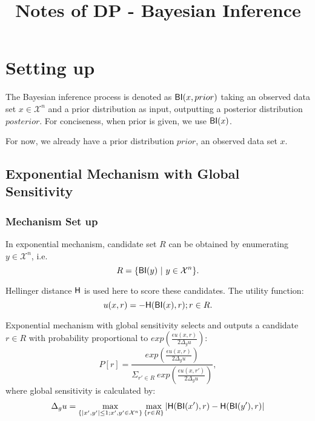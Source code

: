 


\title{\textbf{Notes of DP - Bayesian Inference}\\}
\date{\vspace{-10ex}}


\maketitle

\section{Setting up}
\label{sec_setup}
The Bayesian inference process is denoted as $\mathsf{BI}(x,prior)$ taking an observed data set $x \in \mathcal{X}^n$ and a prior distribution as input, outputting a posterior distribution $posterior$. For conciseness, when prior is given, we use $\mathsf{BI}(x)$.

For now, we already have a prior distribution $prior$, an observed data set $x$.

\subsection{Exponential Mechanism with Global Sensitivity}
\label{subsec_emgs}

\subsubsection{Mechanism Set up}
In exponential mechanism, candidate set $R$ can be obtained by enumerating $y \in \mathcal{X}^n$, i.e.
\begin{equation*}
R = \{\mathsf{BI}(y)\ |\ y \in \mathcal{X}^n\}.
\end{equation*}

Hellinger distance $\mathsf{H}$ is used here to score these candidates. The utility function:
\begin{equation}
\label{equ_utility}
u(x,r) = -\mathsf{H}(\mathsf{BI}(x), r); r \in R.
\end{equation}

Exponential mechanism with global sensitivity selects and outputs a candidate $r \in R$ with probability proportional to $exp(\frac{\epsilon u(x,r)}{2 \Delta_{g}u})$:
\begin{equation*}
P[r] = \frac
{exp(\frac{\epsilon u(x,r)}{2 \Delta_{g}u})}
{\Sigma_{r' \in R}\ exp(\frac{\epsilon u(x,r')}{2 \Delta_{g}u})},
\end{equation*}
where global sensitivity is calculated by:
\begin{equation*}
\Delta_{g}u = 
\max_{\{|x',y'| \leq 1;x',y'\in \mathcal{X}^n\}}\max_{\{r\in R\}}
|\mathsf{H}(\mathsf{BI}(x'), r) - \mathsf{H}(\mathsf{BI}(y'), r)|
\end{equation*}

